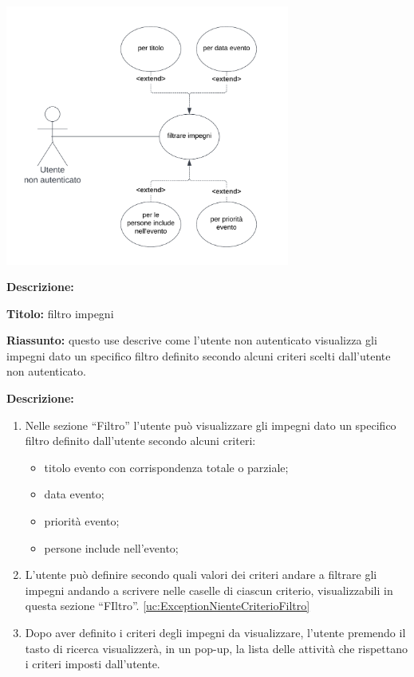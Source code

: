 \begin{listaPersonale}[UC]{}
    \newpage


    \begin{center}
        \includegraphics[width=0.7\textwidth]{img/Diagrammi/UseCases/Filtro.png}
    \end{center}

    \textbf{Descrizione:}

    \textbf{Titolo:} filtro impegni

    \textbf{Riassunto:} questo use descrive come l'utente non autenticato visualizza gli impegni dato un specifico filtro definito secondo alcuni criteri scelti dall'utente non autenticato.

    \textbf{Descrizione:}
    \begin{enumerate}
        \item Nelle sezione “Filtro” l'utente può visualizzare gli impegni dato un specifico filtro definito dall'utente secondo alcuni criteri:
              \begin{itemize}
                  \item titolo evento con corrispondenza totale o parziale;
                  \item data evento;
                  \item priorità evento;
                  \item persone include nell'evento;
              \end{itemize}
        \item L'utente può definire secondo quali valori dei criteri andare a filtrare gli impegni andando a scrivere nelle caselle di ciascun criterio, visualizzabili in questa sezione “FIltro”. \ref{uc:ExceptionNienteCriterioFiltro}
        \item Dopo aver definito i criteri degli impegni da visualizzare, l'utente premendo il tasto di ricerca visualizzerà, in un pop-up, la lista delle attività che rispettano i criteri imposti dall'utente.


\end{enumerate}
\end{listaPersonale}
